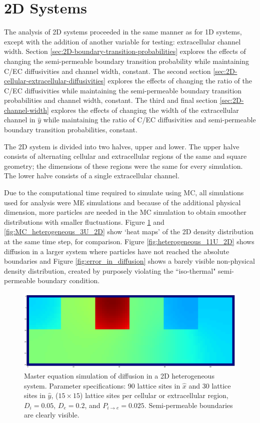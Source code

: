 \section{2D Systems}
\label{sec:ra-2D}
	The analysis of 2D systems proceeded in the same manner as for 1D systems, except with the addition of another variable for testing: extracellular channel width. Section \ref{sec:2D-boundary-transition-probabilities} explores the effects of changing the semi-permeable boundary transition probability while maintaining C/EC diffusivities and channel width, constant. The second section \ref{sec:2D-cellular-extracellular-diffusivities} explores the effects of changing the ratio of the C/EC diffusivities while maintaining the semi-permeable boundary transition probabilities and channel width, constant. The third and final section \ref{sec:2D-channel-width} explores the effects of changing the width of the extracellular channel in $ \hat{y} $ while maintaining the ratio of C/EC diffusivities and semi-permeable boundary transition probabilities, constant.
	
	The 2D system is divided into two halves, upper and lower. The upper halve consists of alternating cellular and extracellular regions of the same and square geometry; the dimensions of these regions were the same for every simulation. The lower halve consists of a single extracellular channel.
	
	Due to the computational time required to simulate using MC, all simulations used for analysis were ME simulations and because of the additional physical dimension, more particles are needed in the MC simulation to obtain smoother distributions with smaller fluctuations. Figure \ref{fig:heterogeneous_3U_2D} and \ref{fig:MC_heterogeneous_3U_2D} show `heat maps' of the 2D density distribution at the same time step, for comparison. Figure \ref{fig:heterogeneous_11U_2D} shows diffusion in a larger system where particles have not reached the absolute boundaries and Figure \ref{fig:error_in_diffusion} shows a barely visible non-physical density distribution, created by purposely violating the ``iso-thermal" semi-permeable boundary condition.
	
	\begin{figure}[h]
		\centering
		\includegraphics[width=1.0\linewidth]{../images/2D/heterogeneous_3U_2D}
		\caption{Master equation simulation of diffusion in a 2D heterogeneous system. Parameter specifications: 90 lattice sites in $ \hat{x} $ and 30 lattice sites in $ \hat{y} $, ($ 15 \times 15 $) lattice sites per cellular or extracellular region, $ D_i = 0.05 $, $ D_e = 0.2 $, and $ P_{i\rightarrow e} = 0.025 $. Semi-permeable boundaries are clearly visible.}
		\label{fig:heterogeneous_3U_2D}
	\end{figure}
	
